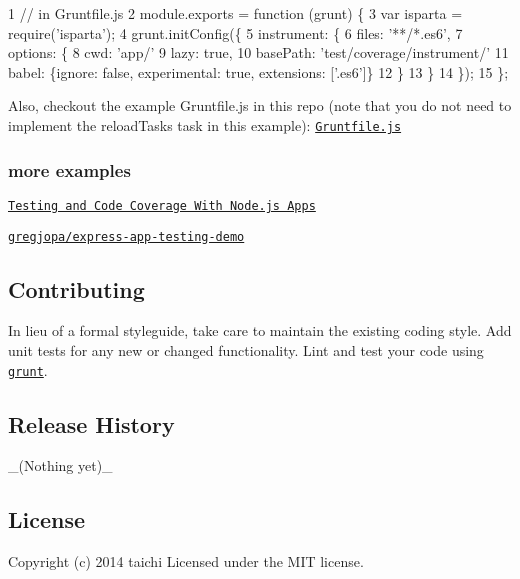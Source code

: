 \begin{DoxyCode}
1 // in Gruntfile.js
2 module.exports = function (grunt) \{
3  var isparta = require('isparta');
4   grunt.initConfig(\{
5     instrument: \{
6       files: '**/*.es6',
7       options: \{
8         cwd: 'app/'
9         lazy: true,
10         basePath: 'test/coverage/instrument/'
11         babel: \{ignore: false, experimental: true, extensions: ['.es6']\}
12       \}
13     \}
14   \});
15 \};
\end{DoxyCode}


Also, checkout the example Gruntfile.\+js in this repo (note that you do not need to implement the {\ttfamily reload\+Tasks} task in this example)\+: \href{https://github.com/taichi/grunt-istanbul/blob/master/Gruntfile.js#69}{\tt Gruntfile.\+js}

\subsubsection*{more examples}


\begin{DoxyItemize}
\item \href{http://www.gregjopa.com/2014/02/testing-and-code-coverage-with-node-js-apps/}{\tt Testing and Code Coverage With Node.\+js Apps}
\begin{DoxyItemize}
\item \href{https://github.com/gregjopa/express-app-testing-demo}{\tt gregjopa/express-\/app-\/testing-\/demo}
\end{DoxyItemize}
\end{DoxyItemize}

\subsection*{Contributing}

In lieu of a formal styleguide, take care to maintain the existing coding style. Add unit tests for any new or changed functionality. Lint and test your code using \href{https://github.com/cowboy/grunt}{\tt grunt}.

\subsection*{Release History}

\+\_\+(\+Nothing yet)\+\_\+

\subsection*{License}

Copyright (c) 2014 taichi Licensed under the M\+I\+T license. 